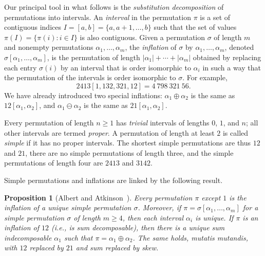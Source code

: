 \documentclass[10pt]{article}
\theoremstyle{plain}
\newtheorem{proposition}[theorem]{Proposition}
\begin{document}
Our principal tool in what follows is the \emph{substitution decomposition} of permutations into intervals.  An \emph{interval} in the permutation $\pi$ is a set of contiguous indices $I=[a,b]=\{a,a+1,\dots,b\}$ such that the set of values $\pi(I)=\{\pi(i) : i\in I\}$ is also contiguous.  Given a permutation $\sigma$ of length $m$ and nonempty permutations $\alpha_1,\dots,\alpha_m$, the \emph{inflation} of $\sigma$ by $\alpha_1,\dots,\alpha_m$,  denoted $\sigma[\alpha_1,\dots,\alpha_m]$, is the permutation of length $|\alpha_1|+\cdots+|\alpha_m|$ obtained by replacing each entry $\sigma(i)$ by an interval that is order isomorphic to $\alpha_i$ in such a way that the permutation of the intervals is order isomorphic to $\sigma$.  For example,
\[
2413[1,132,321,12]=4\ 798\ 321\ 56. 
\]
We have already introduced two special inflations: $\alpha_1\oplus\alpha_2$ is the same as $12[\alpha_1,\alpha_2]$, and $\alpha_1\ominus\alpha_2$ is the same as $21[\alpha_1,\alpha_2]$.

Every permutation of length $n\ge 1$ has \emph{trivial} intervals of lengths $0$, $1$, and $n$; all other intervals are termed \emph{proper}. A permutation of length at least $2$ is called \emph{simple} if it has no proper intervals.  The shortest simple permutations are thus $12$ and $21$, there are no simple permutations of length three, and the simple permutations of length four are $2413$ and $3142$.

Simple permutations and inflations are linked by the following result.

\begin{proposition}[Albert and Atkinson~\cite{albert:simple-permutat:}]
\label{simple-decomp-unique}
Every permutation $\pi$ except $1$ is the inflation of a unique simple permutation $\sigma$.  Moreover, if $\pi=\sigma[\alpha_1,\dots,\alpha_m]$ for a simple permutation $\sigma$ of length $m\ge 4$, then each interval $\alpha_i$ is unique.  If $\pi$ is an inflation of $12$ (i.e., is sum decomposable), then there is a unique sum indecomposable $\alpha_1$  such that $\pi=\alpha_1\oplus\alpha_2$.  The same holds, mutatis mutandis, with $12$ replaced by $21$ and sum replaced by skew.
\end{proposition}
\end{document}
